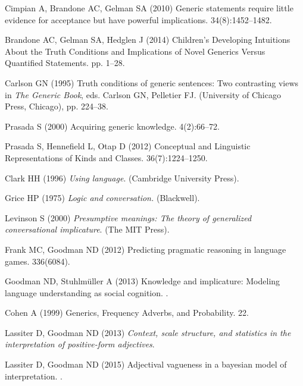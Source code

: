 \documentclass{pnastwo}
\begin{document}
\begin{article}
\begin{thebibliography}{10}
Cimpian A, Brandone AC, Gelman SA (2010) {Generic statements require little
  evidence for acceptance but have powerful implications.}
 34(8):1452--1482.

Brandone AC, Gelman SA, Hedglen J (2014) {Children's Developing Intuitions
  About the Truth Conditions and Implications of Novel Generics Versus
  Quantified Statements.}
 pp. 1--28.

Carlson GN (1995) Truth conditions of generic sentences: Two contrasting views
  in {\em The Generic Book}, eds.{} Carlson GN, Pelletier FJ.
\newblock (University of Chicago Press, Chicago), pp. 224--38.

Prasada S (2000) {Acquiring generic knowledge}.
 4(2):66--72.

Prasada S, Hennefield L, Otap D (2012) {Conceptual and Linguistic
  Representations of Kinds and Classes}.
 36(7):1224--1250.

Clark HH (1996) {\em Using language}.
\newblock (Cambridge University Press).

Grice HP (1975) {\em Logic and conversation.}
\newblock (Blackwell).

Levinson S (2000) {\em Presumptive meanings: The theory of generalized
  conversational implicature}.
\newblock (The MIT Press).

Frank MC, Goodman ND (2012) Predicting pragmatic reasoning in language games.
 336(6084).

Goodman ND, Stuhlm{\"u}ller A (2013) Knowledge and implicature: Modeling
  language understanding as social cognition.
.

Cohen A (1999) {Generics, Frequency Adverbs, and Probability}.
 22.

Lassiter D, Goodman ND (2013) {\em Context, scale structure, and statistics in
  the interpretation of positive-form adjectives}.

Lassiter D, Goodman ND (2015) Adjectival vagueness in a bayesian model of
  interpretation.
.


\end{thebibliography}
\end{article}
\end{document}
